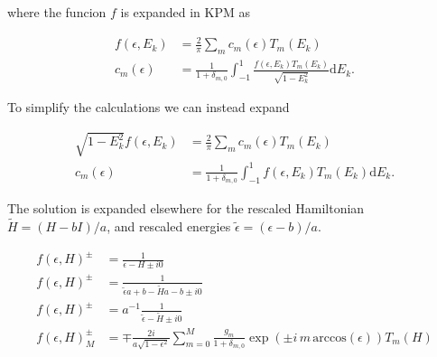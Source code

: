 \documentclass[10pt, onecolumn, aps, prb, superscriptaddress, floatfix, showpacs, notitlepage]{revtex4-1}
\begin{document}
where the funcion $f$ is expanded in KPM as

\begin{align}
f(\epsilon, E_k) &= \frac{2}{\pi}\sum_m c_m(\epsilon)T_m(E_k)\\
c_m(\epsilon) &=\frac{1}{1+\delta_{m,0}}
\int_{-1}^1 \frac{f(\epsilon, E_k) T_m(E_k)}{\sqrt{1-E_k^2}}\mathrm{d}E_k.
\end{align}

To simplify the calculations we can instead expand

\begin{align}
\sqrt{1-E_k^2}f(\epsilon, E_k) &= \frac{2}{\pi}\sum_m c_m(\epsilon)T_m(E_k)\\
c_m(\epsilon) &=\frac{1}{1+\delta_{m,0}}
\int_{-1}^1 {f(\epsilon, E_k) T_m(E_k)}\mathrm{d}E_k.
\end{align}


The solution is expanded elsewhere\cite{Garcia2014} for the rescaled
Hamiltonian $\tilde{H}=(H-bI)/a$, and rescaled energies
$\tilde{\epsilon}=(\epsilon-b)/a$.

\begin{align}
f(\epsilon, H)^\pm &= \frac{1}{\epsilon-H \pm i0}\\
f(\epsilon, H)^\pm &= \frac{1}{\tilde{\epsilon}a+b-\tilde{H}a-b \pm i0}\\
f(\epsilon, H)^\pm &= a^{-1}\frac{1}{\tilde{\epsilon}-\tilde{H} \pm i0}\\
f(\epsilon, H)^\pm_M &= \mp \frac{2i}{a\sqrt{1-\epsilon^2}}
\sum_{m=0}^{M}\frac{g_m}{1+\delta_{m,0}}
\exp(\pm i\,m\,\mathrm{arccos}(\epsilon)) T_m(H)
\end{align}


%
\end{document}
